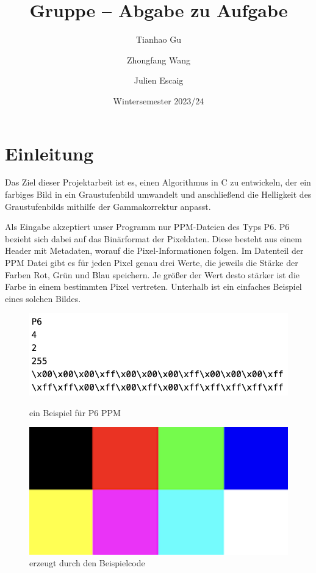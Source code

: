 \documentclass[course=erap]{aspdoc}
\author{Tianhao Gu \and Zhongfang Wang \and Julien Escaig}
\date{Wintersemester 2023/24} %
\title{Gruppe \theGroup{} -- Abgabe zu Aufgabe \theNumber}
\begin{document}
\maketitle

\section{Einleitung}


\par
Das Ziel dieser Projektarbeit ist es, einen Algorithmus in C zu entwickeln, der ein farbiges Bild in ein Graustufenbild umwandelt und anschließend die Helligkeit des Graustufenbilds mithilfe der Gammakorrektur anpasst.

\par
Als Eingabe akzeptiert unser Programm nur PPM-Dateien \cite{netpbm} des Typs P6. P6 bezieht sich dabei auf das Binärformat der Pixeldaten.  Diese besteht aus einem Header mit Metadaten, worauf die Pixel-Informationen folgen. Im Datenteil der PPM Datei gibt es für jeden Pixel genau drei Werte, die jeweils die Stärke der Farben Rot, Grün und Blau speichern. Je größer der Wert desto stärker ist die Farbe in einem bestimmten Pixel vertreten. Unterhalb ist ein einfaches Beispiel eines solchen Bildes.

\begin{figure}[h]
\begin{minipage}{0.45\textwidth}
\centering
\includegraphics[width=\textwidth]{Bilder/demograph.png}
\caption{ein Beispiel für P6 PPM}
\end{minipage}
\hfill
\begin{minipage}{0.45\textwidth}
\centering
\includegraphics[width=\textwidth]{Bilder/demograph.ppm.png}
\caption{erzeugt durch den Beispielcode}
\end{minipage}
\end{figure}
\end{document}
